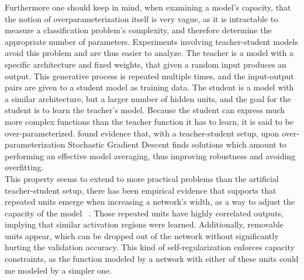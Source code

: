 Furthermore one should keep in mind, when examining a model's capacity, that the notion of overparameterization itself is very vague, as it is intractable to measure a classification problem's complexity, and therefore determine the appropriate number of parameters. Experiments involving teacher-student models avoid this problem and are thus easier to analyze. The teacher is a model with a specific architecture and fixed weights, that given a random input produces an output. This generative process is repeated multiple times, and the input-output pairs are given to a student model as training data. The student is a model with a similar architecture, but a larger number of hidden units, and the goal for the student is to learn the teacher's model. Because the student can express much more complex functions than the teacher function it has to learn, it is said to be over-parameterized. \cite{goldt2019dynamics} found evidence that, with a teacher-student setup, upon over-parameterization Stochastic Gradient Descent finds solutions which amount to performing an effective model averaging, thus improving robustness and avoiding overfitting. \\

This property seems to extend to more practical problems than the artificial teacher-student setup, there has been empirical evidence that supports that repeated units emerge when increasing a network's width, as a way to adjust the capacity of the model ~\autocite{casper2019removable}. Those repeated units have highly correlated outputs, implying that similar activation regions were learned. Additionally, removable units appear, which can be dropped out of the network without significantly hurting the validation accuracy. This kind of self-regularization enforces capacity constraints, as the function modeled by a network with either of these units could me modeled by a simpler one. \\
 
